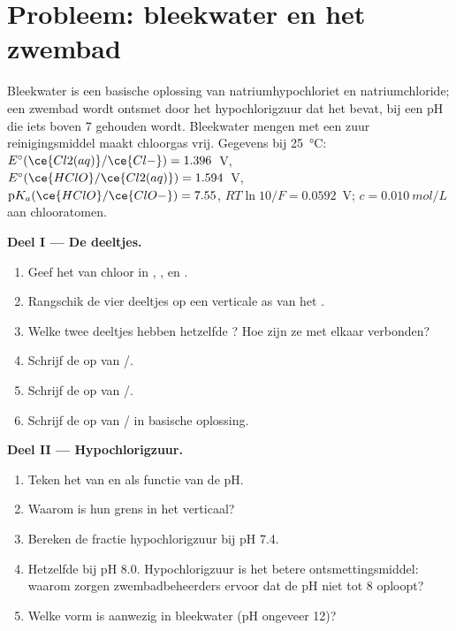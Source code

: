 \section{Probleem: bleekwater en het zwembad}

\begin{problem}
\label{pb:b1:e-ph-diagrams:1}
Bleekwater is een basische oplossing van natriumhypochloriet en
natriumchloride; een zwembad wordt ontsmet door het hypochlorigzuur dat
het bevat, bij een pH die iets boven 7 gehouden wordt. Bleekwater mengen
met een zuur reinigingsmiddel maakt chloorgas vrij. Gegevens bij
\qty{25}{\celsius}: $E^\circ(\ce{Cl2(aq)}/\ce{Cl-})
= 1.396$~V, $E^\circ(\ce{HClO}/\ce{Cl2(aq)}) = 1.594$~V,
$\mathrm{p}K_a(\ce{HClO}/\ce{ClO-}) = 7.55$, $RT\ln 10/F = 0.0592$~V;
 $c = \qty{0.010}{mol/L}$ aan chlooratomen.

\medskip
\noindent\textbf{Deel I --- De deeltjes.}
\begin{enumerate}
  \item Geef het  van chloor in , ,
         en .
  \item Rangschik de vier deeltjes op een verticale as van het
        .
  \item Welke twee deeltjes hebben hetzelfde ? Hoe zijn ze
        met elkaar verbonden?
  \item Schrijf de  op van /.
  \item Schrijf de  op van /.
  \item Schrijf de  op van / in basische
        oplossing.
\end{enumerate}

\medskip
\noindent\textbf{Deel II --- Hypochlorigzuur.}
\begin{enumerate}[resume]
  \item Teken het  van  en  als
        functie van de pH.
  \item Waarom is hun grens in het  verticaal?
  \item Bereken de fractie hypochlorigzuur bij pH 7.4.
  \item Hetzelfde bij pH 8.0. Hypochlorigzuur is het betere
        ontsmettingsmiddel: waarom zorgen zwembadbeheerders ervoor dat de
        pH niet tot 8 oploopt?
  \item Welke vorm is aanwezig in bleekwater (pH ongeveer 12)?
\end{enumerate}


\end{problem}
